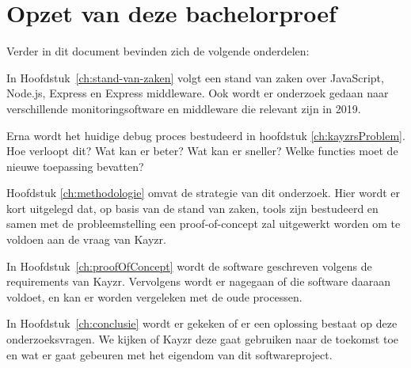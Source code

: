 \section{Opzet van deze bachelorproef}
\label{sec:opzet-bachelorproef}


Verder in dit document bevinden zich de volgende onderdelen:

In Hoofdstuk~\ref{ch:stand-van-zaken} volgt een stand van zaken over JavaScript, Node.js, Express en Express middleware. Ook wordt er onderzoek gedaan naar verschillende monitoringsoftware en middleware die relevant zijn in 2019.

Erna wordt het huidige debug proces bestudeerd in hoofdstuk \ref{ch:kayzrsProblem}. Hoe verloopt dit? Wat kan er beter? Wat kan er sneller? Welke functies moet de nieuwe toepassing bevatten?

Hoofdstuk \ref{ch:methodologie} omvat de strategie van dit onderzoek. Hier wordt er kort uitgelegd dat, op basis van de stand van zaken, tools zijn bestudeerd en samen met de probleemstelling een proof-of-concept zal uitgewerkt worden om te voldoen aan de vraag van Kayzr.

In Hoofdstuk~\ref{ch:proofOfConcept} wordt de software geschreven volgens de requirements van Kayzr. Vervolgens wordt er nagegaan of die software daaraan voldoet, en kan er worden vergeleken met de oude processen.

In Hoofdstuk~\ref{ch:conclusie} wordt er gekeken of er een oplossing bestaat op deze onderzoeksvragen. We kijken of Kayzr deze gaat gebruiken naar de toekomst toe en wat er gaat gebeuren met het eigendom van dit softwareproject.

